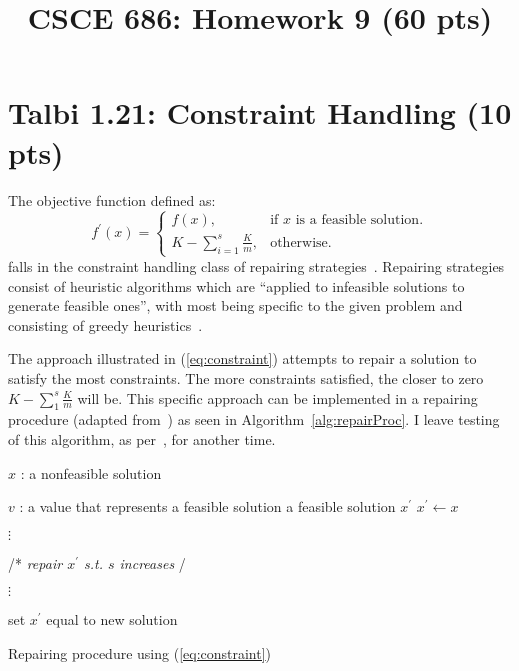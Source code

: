 \documentclass[conference]{../IEEEtran}
\newcommand{\LineComment}[1]{\Statex /* \hfill \textit{#1} \hfill*/}    %
\begin{document}
 \title{CSCE 686: Homework 9 (60 pts)} 

\author{
        }
\maketitle

\section{Talbi 1.21: Constraint Handling (10 pts)} \label{prob1} %

The objective function defined as:
\begin{equation} \label{eq:constraint}
  f^\prime(x)=\begin{cases}
    f(x), & \text{if $x$ is a feasible solution}.\\
    K-\sum_{i=1}^s \frac{K}{m}, & \text{otherwise}.
  \end{cases}
\end{equation}
falls in the constraint handling class of repairing
strategies~\cite[\S1.5.3]{talbi2009}.  Repairing strategies consist of
heuristic algorithms which are ``applied to infeasible solutions to generate
feasible ones'', with most being specific to the given problem and consisting
of greedy heuristics~\cite{talbi2009}. 

The approach illustrated in (\ref{eq:constraint}) attempts to repair a
solution to satisfy the most constraints.  The more constraints satisfied, the
closer to zero $K - \sum_{1}^s \frac{K}{m}$ will be.  This specific approach
can be implemented in a repairing procedure (adapted from~\cite[Algorithm
1.3]{talbi2009}) as seen in Algorithm~\ref{alg:repairProc}.  I leave testing of
this algorithm, as per~\cite{barr2001}, for another time.

\begin{algorithm}[ht!]
    \begin{algorithmic}[1]
      \Require $x$ : a nonfeasible solution\par
      $v$ : a value that represents a feasible solution
      \Ensure a feasible solution $x^\prime$
      \Statex
      \State $x^\prime \leftarrow x$
        \Statex \begin{center} $\vdots$ \end{center}
        \LineComment{repair $x^\prime$ \textit{s.t.} $s$ increases}
        \Statex \begin{center} $\vdots$ \end{center}
        \State set $x^\prime$ equal to new solution
      \EndWhile\\
    \end{algorithmic}
    \caption{Repairing procedure using (\ref{eq:constraint})}
    \label{alg:repairProc}
\end{algorithm}
\end{document}
